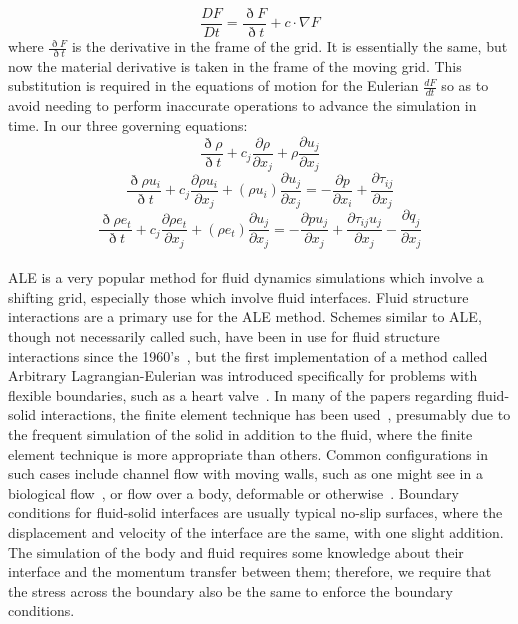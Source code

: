 \documentclass{article}
\def\deriv#1#2{\frac{d #1}{d #2}}
\def\pp#1#2{\frac{\partial #1}{\partial #2}}
\begin{document}
\begin{equation}
  \frac{DF}{Dt} = \frac{\eth F}{\eth t} + c \cdot \nabla F
\end{equation}
where $\frac{\eth F}{\eth t}$ is the derivative in the frame of the grid.  It is essentially the same, but now the material derivative is taken in the frame of the moving grid.  This substitution is required in the equations of motion for the Eulerian $\deriv{F}{t}$ so as to avoid needing to perform inaccurate operations to advance the simulation in time.  In our three governing equations:
\begin{equation}
  \frac{\eth \rho}{\eth t} + c_j \pp{\rho}{x_j} + \rho \pp{u_j}{x_j}
\end{equation}
\begin{equation}
  \frac{\eth \rho u_i}{\eth t} + c_j \pp{\rho u_i}{x_j} + (\rho u_i)\pp{u_j}{x_j} = - \pp{p}{x_i} + \pp{\tau_{ij}}{x_j}
\end{equation}
\begin{equation}
  \frac{\eth \rho e_t}{\eth t} + c_j \pp{\rho e_t}{x_j} + (\rho e_t)\pp{u_j}{x_j} = - \pp{p u_j}{x_j} + \pp{\tau_{ij} u_j}{x_j}  - \pp{q_j}{x_j}
\end{equation}
\\
ALE is a very popular method for fluid dynamics simulations which involve a shifting grid, especially those which involve fluid interfaces.  Fluid structure interactions are a primary use for the ALE method.  Schemes similar to ALE, though not necessarily called such, have been in use for fluid structure interactions since the 1960's~\cite{noh63,trulio66}, but the first implementation of a method called Arbitrary Lagrangian-Eulerian was introduced specifically for problems with flexible boundaries, such as a heart valve~\cite{hirt74}.  In many of the papers regarding fluid-solid interactions, the finite element technique has been used~\cite{hron06,letallec01,souli00}, presumably due to the frequent simulation of the solid in addition to the fluid, where the finite element technique is more appropriate than others.  Common configurations in such cases include channel flow with moving walls, such as one might see in a biological flow~\cite{hron06}, or flow over a body, deformable or otherwise~\cite{farhat05}.  Boundary conditions for fluid-solid interfaces are usually typical no-slip surfaces, where the displacement and velocity of the interface are the same, with one slight addition.  The simulation of the body and fluid requires some knowledge about their interface and the momentum transfer between them; therefore, we require that the stress across the boundary also be the same to enforce the boundary conditions.
\end{document}

